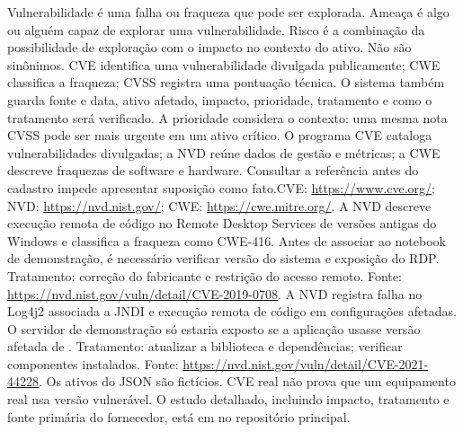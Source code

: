 
 Vulnerabilidade é uma falha ou fraqueza que pode ser explorada. Ameaça é algo ou alguém capaz de explorar uma vulnerabilidade. Risco é a combinação da possibilidade de exploração com o impacto no contexto do ativo. Não são sinônimos.
 CVE identifica uma vulnerabilidade divulgada publicamente; CWE classifica a fraqueza; CVSS registra uma pontuação técnica. O sistema também guarda fonte e data, ativo afetado, impacto, prioridade, tratamento e como o tratamento será verificado. A prioridade considera o contexto: uma mesma nota CVSS pode ser mais urgente em um ativo crítico.
 O programa CVE cataloga vulnerabilidades divulgadas; a NVD reúne dados de gestão e métricas; a CWE descreve fraquezas de software e hardware. Consultar a referência antes do cadastro impede apresentar suposição como fato.\newline CVE: \url{https://www.cve.org/}; NVD: \url{https://nvd.nist.gov/}; CWE: \url{https://cwe.mitre.org/}.
 A NVD descreve execução remota de código no Remote Desktop Services de versões antigas do Windows e classifica a fraqueza como CWE-416. Antes de associar ao notebook de demonstração, é necessário verificar versão do sistema e exposição do RDP. Tratamento: correção do fabricante e restrição do acesso remoto. Fonte: \url{https://nvd.nist.gov/vuln/detail/CVE-2019-0708}.
 A NVD registra falha no Log4j2 associada a JNDI e execução remota de código em configurações afetadas. O servidor de demonstração só estaria exposto se a aplicação usasse versão afetada de . Tratamento: atualizar a biblioteca e dependências; verificar componentes instalados. Fonte: \url{https://nvd.nist.gov/vuln/detail/CVE-2021-44228}.
 Os ativos do JSON são fictícios. CVE real não prova que um equipamento real usa versão vulnerável. O estudo detalhado, incluindo impacto, tratamento e fonte primária do fornecedor, está em  no repositório principal.

